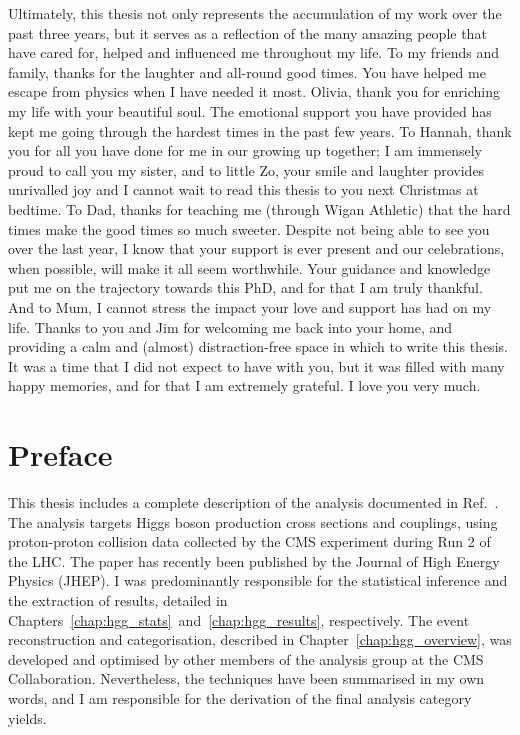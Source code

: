 Ultimately, this thesis not only represents the accumulation of my work over the past three years, but it serves as a reflection of the many amazing people that have cared for, helped and influenced me throughout my life. To my friends and family, thanks for the laughter and all-round good times. You have helped me escape from physics when I have needed it most. Olivia, thank you for enriching my life with your beautiful soul. The emotional support you have provided has kept me going through the hardest times in the past few years. To Hannah, thank you for all you have done for me in our growing up together; I am immensely proud to call you my sister, and to little Zo, your smile and laughter provides unrivalled joy and I cannot wait to read this thesis to you next Christmas at bedtime. To Dad, thanks for teaching me (through Wigan Athletic) that the hard times make the good times so much sweeter. Despite not being able to see you over the last year, I know that your support is ever present and our celebrations, when possible, will make it all seem worthwhile. Your guidance and knowledge put me on the trajectory towards this PhD, and for that I am truly thankful. And to Mum, I cannot stress the impact your love and support has had on my life. Thanks to you and Jim for welcoming me back into your home, and providing a calm and (almost) distraction-free space in which to write this thesis. It was a time that I did not expect to have with you, but it was filled with many happy memories, and for that I am extremely grateful. I love you very much.

\tableofcontents
\listoffigures
\listoftables

\chapter*{\centering Preface}
This thesis includes a complete description of the \Hgg analysis documented in Ref.~\cite{Sirunyan:2021ybb}. The analysis targets Higgs boson production cross sections and couplings, using proton-proton collision data collected by the CMS experiment during Run 2 of the LHC. The paper has recently been published by the Journal of High Energy Physics (JHEP). I was predominantly responsible for the statistical inference and the extraction of results, detailed in Chapters~\ref{chap:hgg_stats}~and~\ref{chap:hgg_results}, respectively. The event reconstruction and categorisation, described in Chapter~\ref{chap:hgg_overview}, was developed and optimised by other members of the \Hgg analysis group at the CMS Collaboration. Nevertheless, the techniques have been summarised in my own words, and I am responsible for the derivation of the final analysis category yields.

